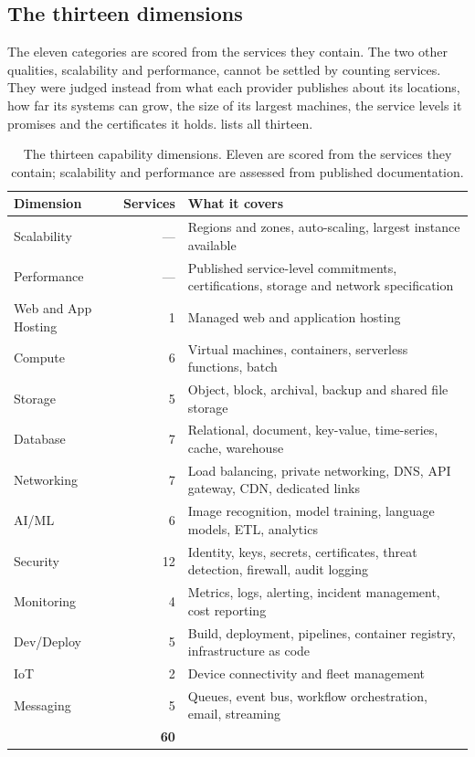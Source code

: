 \subsection*{The thirteen dimensions}

The eleven categories are scored from the services they contain. The two other
qualities, scalability and performance, cannot be settled by counting services.
They were judged instead from what each provider publishes about its locations, how
far its systems can grow, the size of its largest machines, the service levels it
promises and the certificates it holds.  lists all
thirteen.

\begin{table}[htbp]
  \centering
  \caption{The thirteen capability dimensions. Eleven are scored from the
           services they contain; scalability and performance are assessed from
           published documentation.}
  \label{tab:readiness-dimensions}
  \small
  \begin{tabularx}{\textwidth}{@{}l r X@{}}
    \toprule
    \textbf{Dimension} & \textbf{Services} & \textbf{What it covers} \\
    \midrule
    Scalability  & --- & Regions and zones, auto-scaling, largest instance available \\
    Performance  & --- & Published service-level commitments, certifications, storage and network specification \\
    \midrule
    Web and App Hosting &  1 & Managed web and application hosting \\
    Compute      &  6 & Virtual machines, containers, serverless functions, batch \\
    Storage      &  5 & Object, block, archival, backup and shared file storage \\
    Database     &  7 & Relational, document, key-value, time-series, cache, warehouse \\
    Networking   &  7 & Load balancing, private networking, \acs{DNS}, \acs{API} gateway, \acs{CDN}, dedicated links \\
    AI/ML        &  6 & Image recognition, model training, language models, \acs{ETL}, analytics \\
    Security     & 12 & Identity, keys, secrets, certificates, threat detection, firewall, audit logging \\
    Monitoring   &  4 & Metrics, logs, alerting, incident management, cost reporting \\
    Dev/Deploy   &  5 & Build, deployment, pipelines, container registry, infrastructure as code \\
    IoT          &  2 & Device connectivity and fleet management \\
    Messaging    &  5 & Queues, event bus, workflow orchestration, email, streaming \\
    \midrule
    & \textbf{60} & \\
    \bottomrule
  \end{tabularx}
\end{table}


